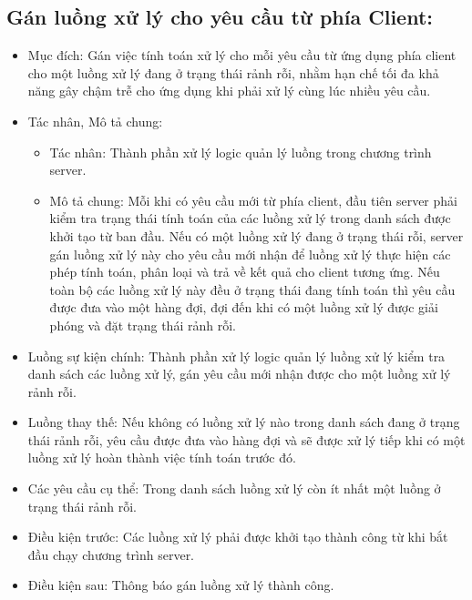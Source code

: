 \subsection{Gán luồng xử lý cho yêu cầu từ phía Client:}
\begin{itemize}
	\item Mục đích: Gán việc tính toán xử lý cho mỗi yêu cầu từ ứng dụng phía client cho một luồng xử lý đang ở trạng thái rảnh rỗi, nhằm hạn chế tối đa khả năng gây chậm trễ cho ứng dụng khi phải xử lý cùng lúc nhiều yêu cầu.
	\item Tác nhân, Mô tả chung:
	\begin{itemize}
		\item Tác nhân: Thành phần xử lý logic quản lý luồng trong chương trình	server.
		\item Mô tả chung: Mỗi khi có yêu cầu mới từ phía client, đầu tiên server phải kiểm tra trạng thái tính toán của các luồng xử lý trong danh sách được khởi tạo từ ban đầu. Nếu có một luồng xử lý đang ở trạng thái	rỗi, server gán luồng xử lý này cho yêu cầu mới nhận để luồng xử lý thực hiện các phép tính toán, phân loại và trả về kết quả cho client tương ứng. Nếu toàn bộ các luồng xử lý này đều ở trạng thái đang tính toán thì yêu cầu được đưa vào một hàng đợi, đợi đến khi có một luồng xử lý được giải phóng và đặt trạng thái rảnh rỗi.
	\end{itemize}
	\item Luồng sự kiện chính: Thành phần xử lý logic quản lý luồng xử lý kiểm tra danh sách các luồng xử lý, gán yêu cầu mới nhận được cho một luồng xử lý rảnh rỗi.
	\item Luồng thay thế: Nếu không có luồng xử lý nào trong danh sách đang ở trạng	thái rảnh rỗi, yêu cầu được đưa vào hàng đợi và sẽ được xử lý tiếp khi có một luồng xử lý hoàn thành việc tính toán trước đó.
	\item Các yêu cầu cụ thể: Trong danh sách luồng xử lý còn ít nhất một luồng ở trạng	thái rảnh rỗi.
	\item Điều kiện trước: Các luồng xử lý phải được khởi tạo thành công từ khi bắt	đầu chạy chương trình server.
	\item Điều kiện sau: Thông báo gán luồng xử lý thành công.
\end{itemize}

